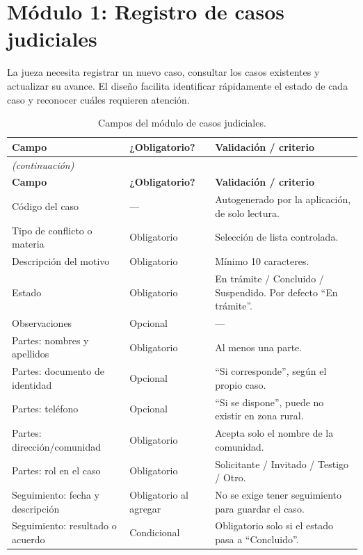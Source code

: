 \documentclass[11pt,a4paper]{article}
\begin{document}
\FloatBarrier
\section{Módulo 1: Registro de casos judiciales}

La jueza necesita registrar un nuevo caso, consultar los casos existentes y actualizar su avance. El diseño
facilita identificar rápidamente el estado de cada caso y reconocer cuáles requieren atención.

{\small
\begin{longtable}{@{}p{4.4cm}p{2.6cm}p{8.2cm}@{}}
\caption{Campos del módulo de casos judiciales.}\\
\toprule
\textbf{Campo} & \textbf{¿Obligatorio?} & \textbf{Validación / criterio} \\
\midrule
\endfirsthead
\multicolumn{3}{l}{\textit{(continuación)}} \\
\toprule
\textbf{Campo} & \textbf{¿Obligatorio?} & \textbf{Validación / criterio} \\
\midrule
\endhead
\bottomrule
\endfoot
Código del caso & --- & Autogenerado por la aplicación, de solo lectura. \\
Tipo de conflicto o materia & Obligatorio & Selección de lista controlada. \\
Descripción del motivo & Obligatorio & Mínimo 10 caracteres. \\
Estado & Obligatorio & En trámite / Concluido / Suspendido. Por defecto \enquote{En trámite}. \\
Observaciones & Opcional & --- \\
Partes: nombres y apellidos & Obligatorio & Al menos una parte. \\
Partes: documento de identidad & Opcional & \enquote{Si corresponde}, según el propio caso. \\
Partes: teléfono & Opcional & \enquote{Si se dispone}, puede no existir en zona rural. \\
Partes: dirección/comunidad & Obligatorio & Acepta solo el nombre de la comunidad. \\
Partes: rol en el caso & Obligatorio & Solicitante / Invitado / Testigo / Otro. \\
Seguimiento: fecha y descripción & Obligatorio al agregar & No se exige tener seguimiento para guardar el caso. \\
Seguimiento: resultado o acuerdo & Condicional & Obligatorio solo si el estado pasa a \enquote{Concluido}. \\
\end{longtable}
}
\end{document}
